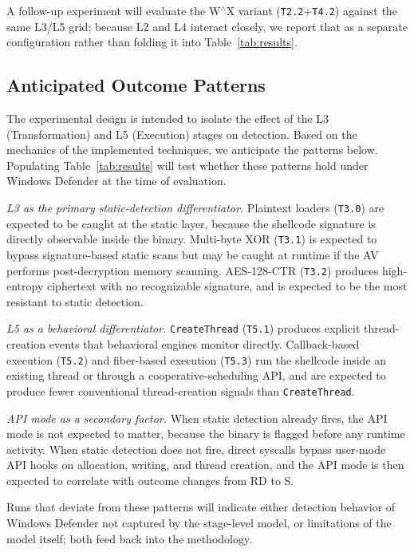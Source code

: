 A follow-up experiment will evaluate the W$^{\wedge}$X variant (\texttt{T2.2}+\texttt{T4.2}) against the same L3/L5 grid; because L2 and L4 interact closely, we report that as a separate configuration rather than folding it into Table~\ref{tab:results}.

\subsection{Anticipated Outcome Patterns}

The experimental design is intended to isolate the effect of the L3 (Transformation) and L5 (Execution) stages on detection.
Based on the mechanics of the implemented techniques, we anticipate the patterns below.
Populating Table~\ref{tab:results} will test whether these patterns hold under Windows Defender at the time of evaluation.

\textit{L3 as the primary static-detection differentiator.}
Plaintext loaders (\texttt{T3.0}) are expected to be caught at the static layer, because the shellcode signature is directly observable inside the binary.
Multi-byte XOR (\texttt{T3.1}) is expected to bypass signature-based static scans but may be caught at runtime if the AV performs post-decryption memory scanning.
AES-128-CTR (\texttt{T3.2}) produces high-entropy ciphertext with no recognizable signature, and is expected to be the most resistant to static detection.

\textit{L5 as a behavioral differentiator.}
\texttt{CreateThread} (\texttt{T5.1}) produces explicit thread-creation events that behavioral engines monitor directly.
Callback-based execution (\texttt{T5.2}) and fiber-based execution (\texttt{T5.3}) run the shellcode inside an existing thread or through a cooperative-scheduling API, and are expected to produce fewer conventional thread-creation signals than \texttt{CreateThread}.

\textit{API mode as a secondary factor.}
When static detection already fires, the API mode is not expected to matter, because the binary is flagged before any runtime activity.
When static detection does not fire, direct syscalls bypass user-mode API hooks on allocation, writing, and thread creation, and the API mode is then expected to correlate with outcome changes from RD to S.

Runs that deviate from these patterns will indicate either detection behavior of Windows Defender not captured by the stage-level model, or limitations of the model itself; both feed back into the methodology.
